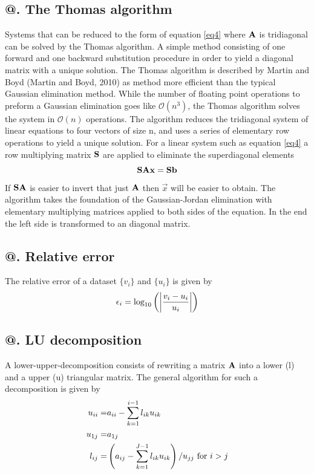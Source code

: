 \documentclass[%
reprint,
amsmath,amssymb,
aps,
]{revtex4-1}
\makeatletter
\newcommand*{\rom}[1]{\expandafter\@slowromancap\romannumeral #1@}
\makeatother
\begin{document}
	\subsection*{\rom{2}. The Thomas algorithm}
	Systems that can be reduced to the form of equation \ref{eq4} where $\bf{A}$ is tridiagonal can be solved by the Thomas algorithm. A simple method consisting of one forward and one backward substitution procedure in order to yield a diagonal matrix with a unique solution. The Thomas algorithm is described by Martin and Boyd (Martin and Boyd, 2010) as method more efficient than the typical Gaussian elimination method. While the number of floating point operations to preform a Gaussian elimination goes like $\mathcal{O}(n^3)$, the Thomas algorithm solves the system in $\mathcal{O}(n)$ operations. The algorithm reduces the tridiagonal system of linear equations to four vectors of size n, and uses a series of elementary row operations to yield a unique solution. For a linear system such as equation \ref{eq4} a row multiplying matrix $\bf{S}$ are applied to eliminate the superdiagonal elements
	\begin{equation*}
	\bf{SAx} = \bf{Sb}
	\end{equation*}
	If $\bf{SA}$ is easier to invert that just $\bf{A}$ then $\vec{x}$ will be easier to obtain. The algorithm takes the foundation of the Gaussian-Jordan elimination with elementary multiplying matrices applied to both sides of the equation. In the end the left side is transformed to an diagonal matrix. 
	
	\subsection*{\rom{3}. Relative error}
	\noindent The relative error of a dataset $\{v_i\}$ and $\{u_i\}$ is given by
	\begin{equation} \label{eq7}
	\epsilon_i = \textnormal{log}_{10} \left( \left\lvert \dfrac{v_i-u_i}{u_i} \right\lvert \right)
\end{equation}

\subsection*{\rom{4}. LU decomposition}
\noindent A lower-upper-decomposition consists of rewriting a matrix $\bf{A}$ into a lower (l) and a upper (u) triangular matrix. The general algorithm for such a decomposition is given by 
\begin{align*}
u_{ii} =& a_{ii} - \sum_{k = 1}^{i-1} l_{ik} u_{ik}  \\
u_{1j} =& a_{1j} \\
l_{ij} =& \left( a_{ij}- \sum_{k = 1}^{J-1} l_{ik} u_{ik} \right) / u_{jj} \textnormal{   for } i > j
\end{align*} 
\end{document}
